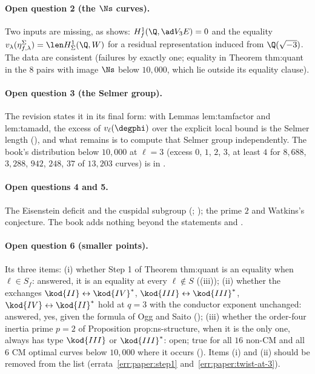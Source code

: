 \begin{sloppypar}
\paragraph{Open question 2 (the $\Ns$ curves).} Two inputs are missing, as  shows: $H^1_f(\Q,\ad V_3E)=0$ and the equality
$v_\lambda(\eta^\Sigma_{f,\lambda})=\len H^1_\Sigma(\Q,W)$ for a residual representation induced from $\Q(\sqrt{-3})$. The data are consistent (failures by exactly one; equality in Theorem thm:quant in
the $8$ pairs with image $\Ns$ below $10{,}000$, which lie outside its equality clause).

\paragraph{Open question 3 (the Selmer group).} The revision states it in its final form: with Lemmas lem:tamfactor and lem:tamadd, the excess of $v_\ell(\degphi)$ over the explicit local
bound is the Selmer length (), and what remains is to compute that Selmer group independently. The book's distribution below $10{,}000$ at $\ell=3$ (excess $0$, $1$,
$2$, $3$, at least $4$ for $8{,}688$, $3{,}288$, $942$, $248$, $37$ of $13{,}203$ curves) is in .

\paragraph{Open questions 4 and 5.} The Eisenstein deficit and the cuspidal subgroup (\cite{Mazur77}; ); the prime $2$ and Watkins's conjecture. The book adds nothing beyond
the statements and .

\paragraph{Open question 6 (smaller points).} Its three items: (i) whether Step 1 of Theorem thm:quant is an equality when $\ell\in S_f$: answered, it is an equality at every $\ell\notin S$
((iii)); (ii) whether the exchanges $\kod{II}\leftrightarrow\kod{IV}^*$, $\kod{III}\leftrightarrow\kod{III}^*$, $\kod{IV}\leftrightarrow\kod{II}^*$ hold at $q=3$ with the conductor exponent unchanged: answered,
yes, given the formula of Ogg and Saito (); (iii) whether the order-four inertia prime $p=2$ of Proposition prop:ns-structure, when it is the only one, always has
type $\kod{III}$ or $\kod{III}^*$: open; true for all $16$ non-CM and all $6$ CM optimal curves below $10{,}000$ where it occurs (). Items (i) and (ii) should be removed from the
list (errata~\ref{err:paper:step1} and~\ref{err:paper:twist-at-3}).


\end{sloppypar}
